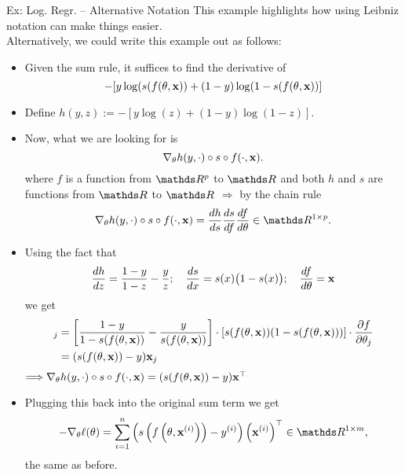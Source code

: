 \documentclass[11pt,compress,t,notes=noshow, xcolor=table]{beamer}
\newcommand{\deriv}{d}
\begin{document}
\begin{vbframe}{Ex: Log. Regr. -- Alternative Notation}
This example highlights how using Leibniz notation can make things easier.\\
Alternatively, we could write this example out as follows:
\begin{itemize}
    \item Given the sum rule, it suffices to find the derivative of 
\[
-[y \log (s(f(\theta,\mathbf{x}))+(1-y) \log (1-s(f(\theta,\mathbf{x}))]
\]
\item Define $h(y,z):=-[y \log (z)+(1-y) \log (1-z)]$.
\item Now, what we are looking for is 
\[
\nabla_\theta h(y,\cdot)\circ s \circ f(\cdot,\mathbf{x}).
\]
where $f$ is a function from $\R^p$ to $\R$ and both $h$ and $s$ are functions from $\R$ to $\R$
$\Longrightarrow$ by the chain rule
$$
\nabla_\theta h(y,\cdot)\circ s \circ f(\cdot,\xv)=\frac{\deriv h}{\deriv s} \frac{\deriv s}{\deriv f} \frac{\deriv f}{\deriv \theta}\in\R^{1\times p}.
$$
\end{itemize}\framebreak
\begin{itemize}
    \item Using the fact that $$\frac{\deriv h}{\deriv z}=\frac{1-y}{1-z}-\frac{y}{z};\quad\frac{\deriv s}{\deriv x}=s(x)\big(1-s(x)\big);\quad\frac{\deriv f}{\deriv \theta}=\xv$$ we get \begin{align*}
   [\nabla_\theta h(y,\cdot)\circ s \circ f(\cdot,\xv)]_j&=\left[\frac{1-y}{1-s(f(\theta,\xv))}-\frac{y}{s(f(\theta,\xv))}\right] \cdot \left[s(f(\theta,\xv))(1-s(f(\theta,\xv)))\right]\cdot \frac{\partial f}{\partial\theta_j}\\
   &=(s(f(\theta,\xv))-y)\xv_j
\end{align*}
$\Longrightarrow \nabla_\theta h(y,\cdot)\circ s \circ f(\cdot,\mathbf{x})=(s(f(\theta,\mathbf{x}))-y)\mathbf{x}^\top$
\item Plugging this back into the original sum term we get $$
-\nabla_\theta \ell (\theta)=\sumin\left(s\left(f\left(\theta,\xv^{(i)}\right)\right)-y^{(i)}\right)\left(\xv^{(i)}\right)^\top\in\R^{1\times m},
$$ the same as before.
\end{itemize}
\end{vbframe}
\end{document}

